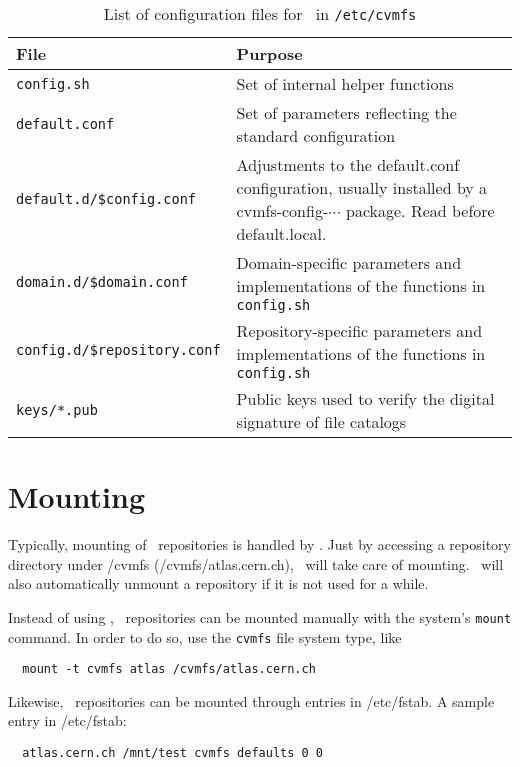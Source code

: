 \begin{table}
	\begin{center}
		\begin{tabularx}{\linewidth}{lX}
			\toprule
			{\bf\centering File} & {\bf\centering Purpose} \\
			\midrule
			\texttt{config.sh} & Set of internal helper functions \\
			\texttt{default.conf} & Set of parameters reflecting the standard configuration \\
			\texttt{default.d/\$config.conf} & Adjustments to the default.conf configuration, usually installed by a cvmfs-config-$\cdots$ package.  Read before default.local.\\
			\texttt{domain.d/\$domain.conf} & Domain-specific parameters and implementations of the functions in \texttt{config.sh} \\
			\texttt{config.d/\$repository.conf} & Repository-specific parameters and implementations of the functions in \texttt{config.sh} \\
			\texttt{keys/*.pub} & Public keys used to verify the digital signature of file catalogs \\
			\bottomrule
		\end{tabularx}
	\end{center}
	\caption{List of configuration files for \cvmfs\ in \texttt{/etc/cvmfs}}
	\label{tbl:configfiles}
\end{table}


\section{Mounting}
Typically, mounting of \cvmfs\ repositories is handled by \autofs.
Just by accessing a repository directory under /cvmfs (\eg /cvmfs/atlas.cern.ch), \autofs\ will take care of mounting.
\autofs\ will also automatically unmount a repository if it is not used for a while.

Instead of using \autofs, \cvmfs\ repositories can be mounted manually with the system's \texttt{mount} command.
In order to do so, use the \texttt{cvmfs} file system type, like
\begin{verbatim}
  mount -t cvmfs atlas /cvmfs/atlas.cern.ch
\end{verbatim}
Likewise, \cvmfs\ repositories can be mounted through entries in /etc/fstab.
A sample entry in /etc/fstab:
\begin{verbatim}
  atlas.cern.ch /mnt/test cvmfs defaults 0 0
\end{verbatim}

